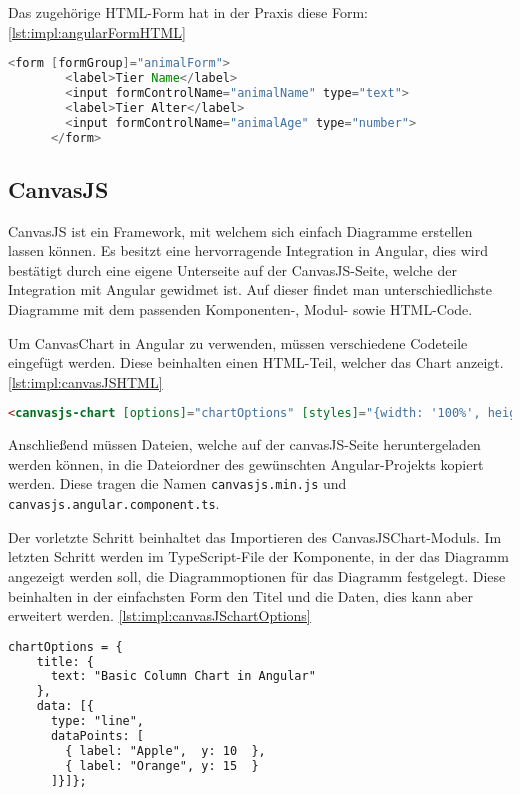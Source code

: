 Das zugehörige HTML-Form hat in der Praxis diese Form:  \ref{lst:impl:angularFormHTML}
 
 
\begin{lstlisting}[language=java,caption=Beispiel für ein reaktives Formular,label=lst:impl:angularFormHTML]
  <form [formGroup]="animalForm">
        <label>Tier Name</label>
        <input formControlName="animalName" type="text">
        <label>Tier Alter</label>
        <input formControlName="animalAge" type="number">
      </form>
\end{lstlisting}
 
 
 
\subsection{CanvasJS}
 
CanvasJS ist ein Framework, mit welchem sich einfach Diagramme erstellen lassen können. Es besitzt eine hervorragende Integration in Angular, dies wird bestätigt durch eine eigene Unterseite auf der CanvasJS-Seite, welche der Integration mit Angular gewidmet ist. Auf dieser findet man unterschiedlichste Diagramme mit dem passenden Komponenten-, Modul- sowie HTML-Code.
 
Um CanvasChart in Angular zu verwenden, müssen verschiedene Codeteile eingefügt werden. Diese beinhalten einen HTML-Teil, welcher das Chart anzeigt. \ref{lst:impl:canvasJSHTML}
 
\begin{lstlisting}[language=html,caption=CanvasJS HTML,label=lst:impl:canvasJSHTML]
  <canvasjs-chart [options]="chartOptions" [styles]="{width: '100%', height: '360px'}"></canvasjs-chart>
\end{lstlisting}
 
Anschließend müssen Dateien, welche auf der canvasJS-Seite heruntergeladen werden können, in die Dateiordner des gewünschten Angular-Projekts kopiert werden. Diese tragen die Namen \texttt{canvasjs.min.js} und \texttt{canvasjs.angular.component.ts}.
 
Der vorletzte Schritt beinhaltet das Importieren des CanvasJSChart-Moduls.
Im letzten Schritt werden im TypeScript-File der Komponente, in der das Diagramm angezeigt werden soll, die Diagrammoptionen für das Diagramm festgelegt. Diese beinhalten in der einfachsten Form den Titel und die Daten, dies kann aber erweitert werden. \ref{lst:impl:canvasJSchartOptions}
 
\begin{lstlisting}[language=html,caption=CanvasJS chartOptiones,label=lst:impl:canvasJSchartOptions]
  chartOptions = {
    title: {
      text: "Basic Column Chart in Angular"
    },
    data: [{
      type: "line",
      dataPoints: [
        { label: "Apple",  y: 10  },
        { label: "Orange", y: 15  }
      ]}]};
\end{lstlisting}
 
